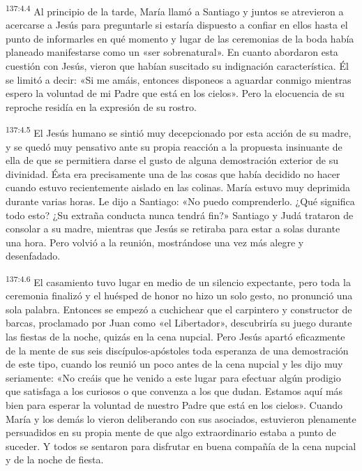 \par
\textsuperscript{137:4.4} Al principio de la tarde, María llamó a Santiago y juntos se atrevieron a acercarse a Jesús para preguntarle si estaría dispuesto a confiar en ellos hasta el punto de informarles en qué momento y lugar de las ceremonias de la boda había planeado manifestarse como un «ser sobrenatural». En cuanto abordaron esta cuestión con Jesús, vieron que habían suscitado su indignación característica. Él se limitó a decir: «Si me amáis, entonces disponeos a aguardar conmigo mientras espero la voluntad de mi Padre que está en los cielos». Pero la elocuencia de su reproche residía en la expresión de su rostro.

\par
\textsuperscript{137:4.5} El Jesús humano se sintió muy decepcionado por esta acción de su madre, y se quedó muy pensativo ante su propia reacción a la propuesta insinuante de ella de que se permitiera darse el gusto de alguna demostración exterior de su divinidad. Ésta era precisamente una de las cosas que había decidido no hacer cuando estuvo recientemente aislado en las colinas. María estuvo muy deprimida durante varias horas. Le dijo a Santiago: «No puedo comprenderlo. ¿Qué significa todo esto? ¿Su extraña conducta nunca tendrá fin?» Santiago y Judá trataron de consolar a su madre, mientras que Jesús se retiraba para estar a solas durante una hora. Pero volvió a la reunión, mostrándose una vez más alegre y desenfadado.

\par
\textsuperscript{137:4.6} El casamiento tuvo lugar en medio de un silencio expectante, pero toda la ceremonia finalizó y el huésped de honor no hizo un solo gesto, no pronunció una sola palabra. Entonces se empezó a cuchichear que el carpintero y constructor de barcas, proclamado por Juan como «el Libertador», descubriría su juego durante las fiestas de la noche, quizás en la cena nupcial. Pero Jesús apartó eficazmente de la mente de sus seis discípulos-apóstoles toda esperanza de una demostración de este tipo, cuando los reunió un poco antes de la cena nupcial y les dijo muy seriamente: «No creáis que he venido a este lugar para efectuar algún prodigio que satisfaga a los curiosos o que convenza a los que dudan. Estamos aquí más bien para esperar la voluntad de nuestro Padre que está en los cielos». Cuando María y los demás lo vieron deliberando con sus asociados, estuvieron plenamente persuadidos en su propia mente de que algo extraordinario estaba a punto de suceder. Y todos se sentaron para disfrutar en buena compañía de la cena nupcial y de la noche de fiesta.

